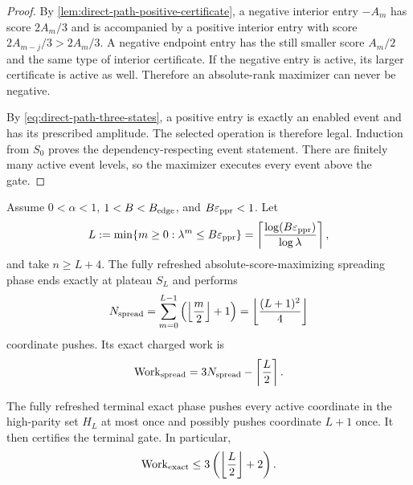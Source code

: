 \begin{proof}
By \cref{lem:direct-path-positive-certificate}, a negative interior entry
$-A_m$ has score $2A_m/3$ and is accompanied by a positive interior entry
with score $2A_{m-j}/3>2A_m/3$. A negative endpoint entry has the still
smaller score $A_m/2$ and the same type of interior certificate. If the
negative entry is active, its larger certificate is active as well.
Therefore an absolute-rank maximizer can never be negative.

By \cref{eq:direct-path-three-states}, a positive entry is exactly an enabled
event and has its prescribed amplitude. The selected operation is therefore
legal. Induction from $S_0$ proves the dependency-respecting event statement.
There are finitely many active event levels, so the maximizer executes every
event above the gate.
\end{proof}

\begin{theorem}
\label{thm:direct-path-two-rung}
Assume $0<\alpha<1$, $1<B<B_{\rm edge}$, and $B\varepsilon_{\mathrm{ppr}}<1$. Let
\begin{equation}
 L:=\min\{m\geq0:\lambda^m\leq B\varepsilon_{\mathrm{ppr}}\}
 =\left\lceil\frac{\log(B\varepsilon_{\mathrm{ppr}})}{\log\lambda}\right\rceil,
 \label{eq:direct-path-depth}
\end{equation}
and take $n\geq L+4$. The fully refreshed absolute-score-maximizing spreading
phase ends exactly at plateau $S_L$ and performs
\begin{equation}
 N_{\rm spread}
 =\sum_{m=0}^{L-1}\left(\left\lfloor\frac m2\right\rfloor+1\right)
 =\left\lfloor\frac{(L+1)^2}{4}\right\rfloor
 \label{eq:direct-path-push-count}
\end{equation}
coordinate pushes. Its exact charged work is
\begin{equation}
 \operatorname{Work}_{\rm spread}
 =3N_{\rm spread}-\left\lceil\frac L2\right\rceil.
 \label{eq:direct-path-spread-work}
\end{equation}

The fully refreshed terminal exact phase pushes every active coordinate in
the high-parity set $H_L$ at most once and possibly pushes coordinate $L+1$
once. It then certifies the terminal gate. In particular,
\begin{equation}
 \operatorname{Work}_{\rm exact}
 \leq3\left(\left\lfloor\frac L2\right\rfloor+2\right).
 \label{eq:direct-path-exact-work}
\end{equation}
\end{theorem}

